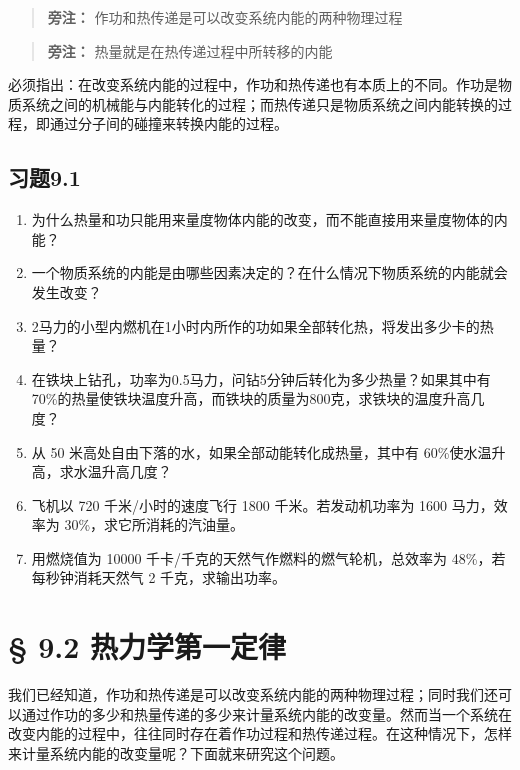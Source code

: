 \begin{quote}
\textbf{旁注：} 作功和热传递是可以改变系统内能的两种物理过程
\end{quote}

\begin{quote}
\textbf{旁注：} 热量就是在热传递过程中所转移的内能
\end{quote}

必须指出：在改变系统内能的过程中，作功和热传递也有本质上的不同。作功是物质系统之间的机械能与内能转化的过程；而热传递只是物质系统之间内能转换的过程，即通过分子间的碰撞来转换内能的过程。

\subsection{习题9.1}\label{ux4e60ux98989.1}

\begin{enumerate}
\def\labelenumi{\arabic{enumi}.}
\item
  为什么热量和功只能用来量度物体内能的改变，而不能直接用来量度物体的内能？
\item
  一个物质系统的内能是由哪些因素决定的？在什么情况下物质系统的内能就会发生改变？
\item
  2马力的小型内燃机在1小时内所作的功如果全部转化热，将发出多少卡的热量？
\item
  在铁块上钻孔，功率为0.5马力，问钻5分钟后转化为多少热量？如果其中有70\%的热量使铁块温度升高，而铁块的质量为800克，求铁块的温度升高几度？
\item
  从 50 米高处自由下落的水，如果全部动能转化成热量，其中有
  60\%使水温升高，求水温升高几度？
\item
  飞机以 720 千米/小时的速度飞行 1800 千米。若发动机功率为 1600
  马力，效率为 30\%，求它所消耗的汽油量。
\item
  用燃烧值为 10000 千卡/千克的天然气作燃料的燃气轮机，总效率为
  48\%，若每秒钟消耗天然气 2 千克，求输出功率。
\end{enumerate}

\section{§ 9.2
热力学第一定律}\label{ux70edux529bux5b66ux7b2cux4e00ux5b9aux5f8b}

我们已经知道，作功和热传递是可以改变系统内能的两种物理过程；同时我们还可以通过作功的多少和热量传递的多少来计量系统内能的改变量。然而当一个系统在改变内能的过程中，往往同时存在着作功过程和热传递过程。在这种情况下，怎样来计量系统内能的改变量呢？下面就来研究这个问题。

